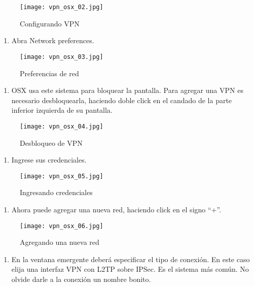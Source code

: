 \documentclass[10pt,a5paper,twoside,,]{book}
\providecommand{\tightlist}{%
  \setlength{\itemsep}{0pt}\setlength{\parskip}{0pt}}
\begin{document}
\begin{figure}[htbp]
\centering
\texttt{[image: vpn\_osx\_02.jpg]}
\caption{Configurando VPN}
\end{figure}

\begin{enumerate}
\def\labelenumi{\arabic{enumi}.}
\setcounter{enumi}{2}
\tightlist
\item
  Abra Network preferences.
\end{enumerate}

\begin{figure}[htbp]
\centering
\texttt{[image: vpn\_osx\_03.jpg]}
\caption{Preferencias de red}
\end{figure}

\begin{enumerate}
\def\labelenumi{\arabic{enumi}.}
\setcounter{enumi}{3}
\tightlist
\item
  OSX usa este sistema para bloquear la pantalla. Para agregar una VPN
  es necesario desbloquearla, haciendo doble click en el candado de la
  parte inferior izquierda de su pantalla.
\end{enumerate}

\begin{figure}[htbp]
\centering
\texttt{[image: vpn\_osx\_04.jpg]}
\caption{Desbloqueo de VPN}
\end{figure}

\begin{enumerate}
\def\labelenumi{\arabic{enumi}.}
\setcounter{enumi}{4}
\tightlist
\item
  Ingrese sus credenciales.
\end{enumerate}

\begin{figure}[htbp]
\centering
\texttt{[image: vpn\_osx\_05.jpg]}
\caption{Ingresando credenciales}
\end{figure}

\begin{enumerate}
\def\labelenumi{\arabic{enumi}.}
\setcounter{enumi}{5}
\tightlist
\item
  Ahora puede agregar una nueva red, haciendo click en el signo ``+''.
\end{enumerate}

\begin{figure}[htbp]
\centering
\texttt{[image: vpn\_osx\_06.jpg]}
\caption{Agregando una nueva red}
\end{figure}

\begin{enumerate}
\def\labelenumi{\arabic{enumi}.}
\setcounter{enumi}{6}
\tightlist
\item
  En la ventana emergente deberá especificar el tipo de conexión. En
  este caso elija una interfaz VPN con L2TP sobre IPSec. Es el sistema
  más común. No olvide darle a la conexión un nombre bonito.
\end{enumerate}
\end{document}
